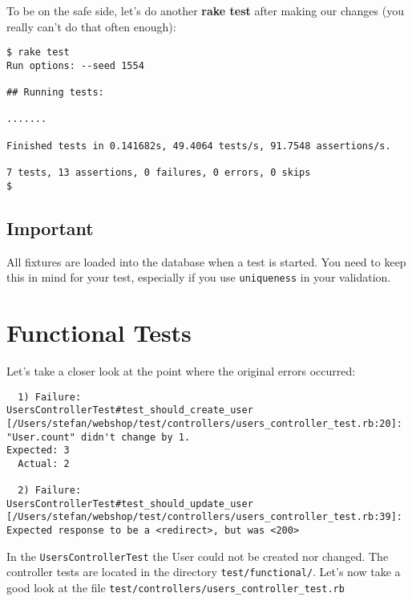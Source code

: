 \documentclass[a4paper]{book}
\newcounter{tab}[chapter]
\begin{document}
To be on the safe side, let's do another \textbf{rake test} after making our changes (you really can't do that often enough):

\begin{shaded}\begin{verbatim}
$ rake test
Run options: --seed 1554

## Running tests:

.......

Finished tests in 0.141682s, 49.4064 tests/s, 91.7548 assertions/s.

7 tests, 13 assertions, 0 failures, 0 errors, 0 skips
$
\end{verbatim}\end{shaded}

\subsection{Important}\label{important-11}

All fixtures are loaded into the database when a test is started. You need to keep this in mind for your test, especially if you use \texttt{uniqueness} in your validation.

\section{Functional Tests}\label{functional-tests}

Let's take a closer look at the point where the original errors occurred:

\begin{shaded}\begin{verbatim}
  1) Failure:
UsersControllerTest#test_should_create_user [/Users/stefan/webshop/test/controllers/users_controller_test.rb:20]:
"User.count" didn't change by 1.
Expected: 3
  Actual: 2

  2) Failure:
UsersControllerTest#test_should_update_user [/Users/stefan/webshop/test/controllers/users_controller_test.rb:39]:
Expected response to be a <redirect>, but was <200>
\end{verbatim}\end{shaded}

In the \texttt{UsersControllerTest} the User could not be created nor changed. The controller tests are located in the directory \texttt{test/functional/}. Let's now take a good look at the file \texttt{test/controllers/users\_controller\_test.rb}
\end{document}
